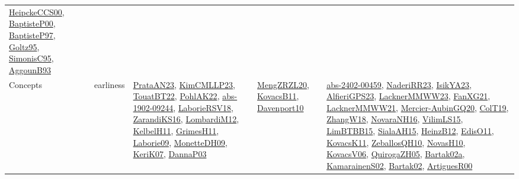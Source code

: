 {\begin{longtable}{lp{3cm}>{\raggedright}p{6cm}>{\raggedright}p{6cm}p{8cm}}
\href{articles/HeipckeCCS00.pdf}{HeipckeCCS00}\cite{HeipckeCCS00}, \href{articles/BaptisteP00.pdf}{BaptisteP00}\cite{BaptisteP00}, \href{papers/BaptisteP97.pdf}{BaptisteP97}\cite{BaptisteP97}, \href{papers/Goltz95.pdf}{Goltz95}\cite{Goltz95}, \href{papers/SimonisC95.pdf}{SimonisC95}\cite{SimonisC95}, \href{articles/AggounB93.pdf}{AggounB93}\cite{AggounB93}\\
Concepts & earliness & \href{articles/PrataAN23.pdf}{PrataAN23}\cite{PrataAN23}, \href{papers/KimCMLLP23.pdf}{KimCMLLP23}\cite{KimCMLLP23}, \href{papers/TouatBT22.pdf}{TouatBT22}\cite{TouatBT22}, \href{articles/PohlAK22.pdf}{PohlAK22}\cite{PohlAK22}, \href{articles/abs-1902-09244.pdf}{abs-1902-09244}\cite{abs-1902-09244}, \href{articles/LaborieRSV18.pdf}{LaborieRSV18}\cite{LaborieRSV18}, \href{articles/ZarandiKS16.pdf}{ZarandiKS16}\cite{ZarandiKS16}, \href{articles/LombardiM12.pdf}{LombardiM12}\cite{LombardiM12}, \href{articles/KelbelH11.pdf}{KelbelH11}\cite{KelbelH11}, \href{papers/GrimesH11.pdf}{GrimesH11}\cite{GrimesH11}, \href{papers/Laborie09.pdf}{Laborie09}\cite{Laborie09}, \href{papers/MonetteDH09.pdf}{MonetteDH09}\cite{MonetteDH09}, \href{papers/KeriK07.pdf}{KeriK07}\cite{KeriK07}, \href{papers/DannaP03.pdf}{DannaP03}\cite{DannaP03} & \href{articles/MengZRZL20.pdf}{MengZRZL20}\cite{MengZRZL20}, \href{articles/KovacsB11.pdf}{KovacsB11}\cite{KovacsB11}, \href{papers/Davenport10.pdf}{Davenport10}\cite{Davenport10} & \href{articles/abs-2402-00459.pdf}{abs-2402-00459}\cite{abs-2402-00459}, \href{articles/NaderiRR23.pdf}{NaderiRR23}\cite{NaderiRR23}, \href{articles/IsikYA23.pdf}{IsikYA23}\cite{IsikYA23}, \href{articles/AlfieriGPS23.pdf}{AlfieriGPS23}\cite{AlfieriGPS23}, \href{articles/LacknerMMWW23.pdf}{LacknerMMWW23}\cite{LacknerMMWW23}, \href{articles/FanXG21.pdf}{FanXG21}\cite{FanXG21}, \href{papers/LacknerMMWW21.pdf}{LacknerMMWW21}\cite{LacknerMMWW21}, \href{papers/Mercier-AubinGQ20.pdf}{Mercier-AubinGQ20}\cite{Mercier-AubinGQ20}, \href{papers/ColT19.pdf}{ColT19}\cite{ColT19}, \href{articles/ZhangW18.pdf}{ZhangW18}\cite{ZhangW18}, \href{articles/NovaraNH16.pdf}{NovaraNH16}\cite{NovaraNH16}, \href{papers/VilimLS15.pdf}{VilimLS15}\cite{VilimLS15}, \href{papers/LimBTBB15.pdf}{LimBTBB15}\cite{LimBTBB15}, \href{papers/SialaAH15.pdf}{SialaAH15}\cite{SialaAH15}, \href{papers/HeinzB12.pdf}{HeinzB12}\cite{HeinzB12}, \href{papers/EdisO11.pdf}{EdisO11}\cite{EdisO11}, \href{articles/KovacsK11.pdf}{KovacsK11}\cite{KovacsK11}, \href{articles/ZeballosQH10.pdf}{ZeballosQH10}\cite{ZeballosQH10}, \href{articles/NovasH10.pdf}{NovasH10}\cite{NovasH10}, \href{papers/KovacsV06.pdf}{KovacsV06}\cite{KovacsV06}, \href{papers/QuirogaZH05.pdf}{QuirogaZH05}\cite{QuirogaZH05}, \href{papers/Bartak02a.pdf}{Bartak02a}\cite{Bartak02a}, \href{papers/KamarainenS02.pdf}{KamarainenS02}\cite{KamarainenS02}, \href{papers/Bartak02.pdf}{Bartak02}\cite{Bartak02}, \href{articles/ArtiguesR00.pdf}{ArtiguesR00}\cite{ArtiguesR00}\\

\end{longtable}}
